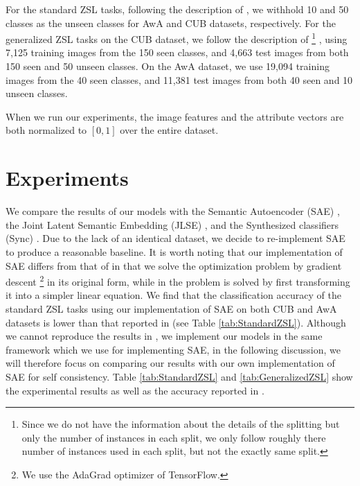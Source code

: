 \documentclass{article}
\begin{document}
For the standard ZSL tasks, following the description of \cite{kodirov2017semantic}, we withhold 10 and 50 classes as the unseen classes for AwA and CUB datasets, respectively. For the generalized ZSL tasks on the CUB dataset, we follow the description of \cite{Xian2017}%
\footnote{Since we do not have the information about the details of the splitting but only the number of instances in each split, we only follow roughly there number of instances used in each split, but not the exactly same split.}%
, using 7,125 training images from the 150 seen classes, and 4,663 test images from both 150 seen and 50 unseen classes. On the AwA dataset, we use 19,094 training images from the 40 seen classes, and 11,381 test images from both 40 seen and 10 unseen classes.

When we run our experiments, the image features and the attribute vectors are both normalized to $[0, 1]$ over the entire dataset.




\section{Experiments}

We compare the results of our models with the Semantic Autoencoder (SAE) \cite{kodirov2017semantic}, the Joint Latent Semantic Embedding (JLSE) \cite{zhang2016zero}, and the Synthesized classifiers (Sync) \cite{changpinyo2016synthesized}. Due to the lack of an identical dataset, we decide to re-implement SAE to produce a reasonable baseline. It is worth noting that our implementation of SAE differs from that of \cite{kodirov2017semantic} in that we solve the optimization problem by gradient descent%
\footnote{We use the AdaGrad optimizer of TensorFlow.}%
in its original form, while in \cite{kodirov2017semantic} the problem is solved by first transforming it into a simpler linear equation. We find that the classification accuracy of the standard ZSL tasks using our implementation of SAE on both CUB and AwA datasets is lower than that reported in \cite{kodirov2017semantic} (see Table \ref{tab:StandardZSL}). Although we cannot reproduce the results in \cite{kodirov2017semantic}, we implement our models in the same framework which we use for implementing SAE, in the following discussion, we will therefore focus on comparing our results with our own implementation of SAE for self consistency. Table \ref{tab:StandardZSL} and \ref{tab:GeneralizedZSL} show the experimental results as well as the accuracy reported in \cite{kodirov2017semantic}.
\end{document}
